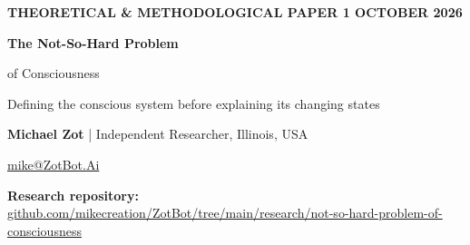 \documentclass[11pt,letterpaper]{article}
\newcommand{\repoURL}{https://github.com/mikecreation/ZotBot/tree/main/research/not-so-hard-problem-of-consciousness}
\begin{document}
\thispagestyle{firstpage}

\begin{tcolorbox}[
  enhanced, boxrule=0pt, arc=3mm,
  interior style={left color=navy,right color=teal},
  left=6mm,right=6mm,top=5mm,bottom=5mm
]
{\scriptsize\sffamily\bfseries\color{white!88} THEORETICAL \& METHODOLOGICAL PAPER \hfill 1 OCTOBER 2026\par}
\vspace{1.0em}
{\fontsize{30}{33}\selectfont\bfseries\color{white} The Not-So-Hard Problem\par of Consciousness\par}
\vspace{0.8em}
{\large\sffamily\color{white!94} Defining the conscious system before explaining its changing states\par}
\end{tcolorbox}

\vspace{0.65em}
{\normalsize\textbf{Michael Zot} \quad \textcolor{linegray}{|} \quad Independent Researcher, Illinois, USA\par}
{\small \href{mailto:mike@ZotBot.Ai}{mike@ZotBot.Ai}\par}
{\small\sffamily\textbf{Research repository:} \href{\repoURL}{github.com/mikecreation/ZotBot/tree/main/research/not-so-hard-problem-of-consciousness}\par}
\vspace{0.55em}
\end{document}
